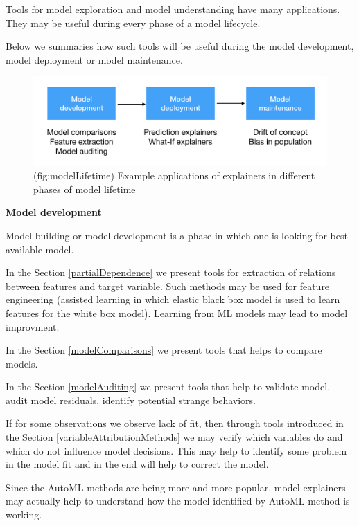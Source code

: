 \documentclass[]{krantz}
\theoremstyle{definition}
\theoremstyle{definition}
\theoremstyle{definition}
\theoremstyle{remark}
\begin{document}
Tools for model exploration and model understanding have many
applications. They may be useful during every phase of a model
lifecycle.

Below we summaries how such tools will be useful during the model
development, model deployment or model maintenance.

\begin{figure}

{\centering \includegraphics[width=0.9\linewidth]{figure/modelLifetime} 

}

\caption{(fig:modelLifetime) Example applications of explainers in different phases of model lifetime}\label{fig:modelLifetime}
\end{figure}

\textbf{Model development}

Model building or model development is a phase in which one is looking
for best available model.

In the Section \ref{partialDependence} we present tools for extraction
of relations between features and target variable. Such methods may be
used for feature engineering (assisted learning in which elastic black
box model is used to learn features for the white box model). Learning
from ML models may lead to model improvment.

In the Section \ref{modelComparisons} we present tools that helps to
compare models.

In the Section \ref{modelAuditing} we present tools that help to
validate model, audit model residuals, identify potential strange
behaviors.

If for some observations we observe lack of fit, then through tools
introduced in the Section \ref{variableAttributionMethods} we may verify
which variables do and which do not influence model decisions. This may
help to identify some problem in the model fit and in the end will help
to correct the model.

Since the AutoML methods are being more and more popular, model
explainers may actually help to understand how the model identified by
AutoML method is working.
\end{document}
